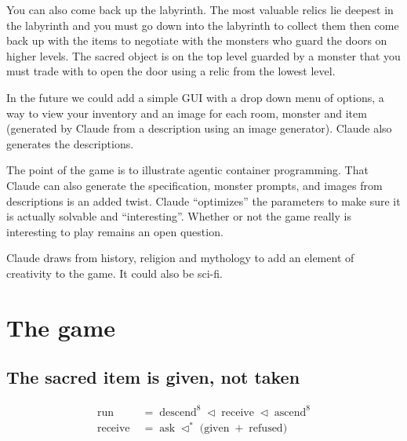 \documentclass[11pt,a4paper]{article}
\newcommand{\seqb}{\lhd^{\ast}}
\begin{document}
\begin{sectionbox}
\medskip

You can also come back up the labyrinth. The most valuable relics lie deepest in the labyrinth and
you must go down into the labyrinth to collect them then come back up with the items to negotiate
with the monsters who guard the doors on higher levels. The sacred object is on the top level
guarded by a monster that you must trade with to open the door using a relic from the lowest level.

\medskip

In the future we could add a simple GUI with a drop down menu of options, a
way to view your inventory and an image for each room, monster and item (generated by Claude from a
description using an image generator). Claude also generates the descriptions.

\medskip

The point of the game is to illustrate agentic container programming. That Claude can also generate
the specification, monster prompts, and images from descriptions is an added twist. Claude ``optimizes'' the parameters to make sure it is
actually solvable and ``interesting''. Whether or not the game really is interesting to play
remains an open question.

\medskip

Claude draws from history, religion and mythology to add an element of creativity to the game. It
could also be sci-fi.
\end{sectionbox}

\section{The game}
\label{sec:game}

\subsection{The sacred item is given, not taken}
\label{sec:sacred}

\begin{center}
\begin{tcolorbox}[plainbg, colback=pale, width=0.9\textwidth]
\begin{align*}
\text{run} \;&=\; \text{descend}^{8} \;\lhd\; \text{receive} \;\lhd\; \text{ascend}^{8} \\
\text{receive} \;&=\; \text{ask} \;\seqb\; \bigl( \text{given} \;+\; \text{refused} \bigr)
\end{align*}
\end{tcolorbox}
\end{center}
\end{document}
